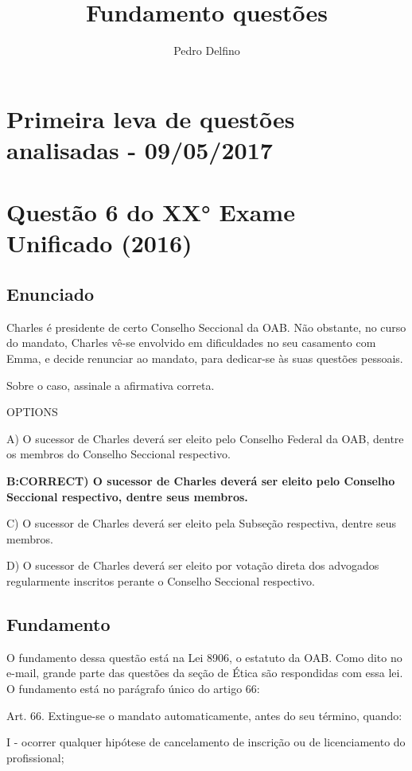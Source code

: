 \documentclass[12pt]{article}
\title{Fundamento questões}
\author{Pedro Delfino}
\begin{document}
\maketitle

\section*{Primeira leva de questões analisadas - 09/05/2017} 

\section{Questão 6 do XX° Exame Unificado (2016)} 

\subsection{Enunciado} 

Charles é presidente de certo Conselho Seccional da OAB. Não
obstante, no curso do mandato, Charles vê-se envolvido em
dificuldades no seu casamento com Emma, e decide renunciar
ao mandato, para dedicar-se às suas questões pessoais.


Sobre o caso, assinale a afirmativa correta.


OPTIONS


A) O sucessor de Charles deverá ser eleito pelo Conselho
Federal da OAB, dentre os membros do Conselho Seccional
respectivo.


\textbf{B:CORRECT) O sucessor de Charles deverá ser eleito pelo Conselho Seccional respectivo, dentre seus membros.}

C) O sucessor de Charles deverá ser eleito pela Subseção
respectiva, dentre seus membros.

D) O sucessor de Charles deverá ser eleito por votação direta
dos advogados regularmente inscritos perante o Conselho
Seccional respectivo.


\subsection{Fundamento}

O fundamento dessa questão está na Lei 8906, o estatuto da OAB. Como dito no e-mail, grande parte das questões da seção de Ética são respondidas com essa lei. O fundamento está no parágrafo único do artigo 66:

Art. 66. Extingue-se o mandato automaticamente, antes do seu término, quando:

I - ocorrer qualquer hipótese de cancelamento de inscrição ou de licenciamento do profissional;
\end{document}
